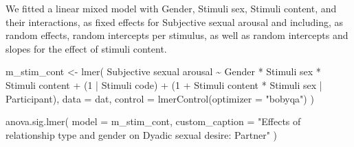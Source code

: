 \documentclass[
  bookmarksnumbered]{article}
\newenvironment{Shaded}{\begin{snugshade}}{\end{snugshade}}
\newcommand{\AttributeTok}[1]{\textcolor[rgb]{0.80,0.80,0.80}{#1}}
\newcommand{\DecValTok}[1]{\textcolor[rgb]{0.86,0.86,0.80}{#1}}
\newcommand{\FunctionTok}[1]{\textcolor[rgb]{0.94,0.94,0.56}{#1}}
\newcommand{\NormalTok}[1]{\textcolor[rgb]{0.80,0.80,0.80}{#1}}
\newcommand{\OtherTok}[1]{\textcolor[rgb]{0.94,0.94,0.56}{#1}}
\newcommand{\SpecialCharTok}[1]{\textcolor[rgb]{0.86,0.64,0.64}{#1}}
\newcommand{\StringTok}[1]{\textcolor[rgb]{0.80,0.58,0.58}{#1}}
\begin{document}
We fitted a linear mixed model with Gender, Stimuli sex, Stimuli content, and their interactions, as fixed effects for Subjective sexual arousal and including, as random effects, random intercepts per stimulus, as well as random intercepts and slopes for the effect of stimuli content.

\begin{Shaded}
\begin{Highlighting}[]
\NormalTok{m\_stim\_cont }\OtherTok{\textless{}{-}} \FunctionTok{lmer}\NormalTok{(}
  \StringTok{\textasciigrave{}}\AttributeTok{Subjective sexual arousal}\StringTok{\textasciigrave{}} \SpecialCharTok{\textasciitilde{}}
\NormalTok{    Gender }\SpecialCharTok{*} \StringTok{\textasciigrave{}}\AttributeTok{Stimuli sex}\StringTok{\textasciigrave{}} \SpecialCharTok{*} \StringTok{\textasciigrave{}}\AttributeTok{Stimuli content}\StringTok{\textasciigrave{}} \SpecialCharTok{+}
\NormalTok{    (}\DecValTok{1} \SpecialCharTok{|} \StringTok{\textasciigrave{}}\AttributeTok{Stimuli code}\StringTok{\textasciigrave{}}\NormalTok{) }\SpecialCharTok{+}
\NormalTok{    (}\DecValTok{1} \SpecialCharTok{+} \StringTok{\textasciigrave{}}\AttributeTok{Stimuli content}\StringTok{\textasciigrave{}} \SpecialCharTok{*} \StringTok{\textasciigrave{}}\AttributeTok{Stimuli sex}\StringTok{\textasciigrave{}} \SpecialCharTok{|}\NormalTok{ Participant),}
  \AttributeTok{data =}\NormalTok{ dat,}
  \AttributeTok{control =} \FunctionTok{lmerControl}\NormalTok{(}\AttributeTok{optimizer =} \StringTok{"bobyqa"}\NormalTok{)}
\NormalTok{)}

\FunctionTok{anova.sig.lmer}\NormalTok{(}
  \AttributeTok{model =}\NormalTok{ m\_stim\_cont,}
  \AttributeTok{custom\_caption =} \StringTok{"Effects of relationship type and gender}
\StringTok{               on Dyadic sexual desire: Partner"}
\NormalTok{)}
\end{Highlighting}
\end{Shaded}
\end{document}

